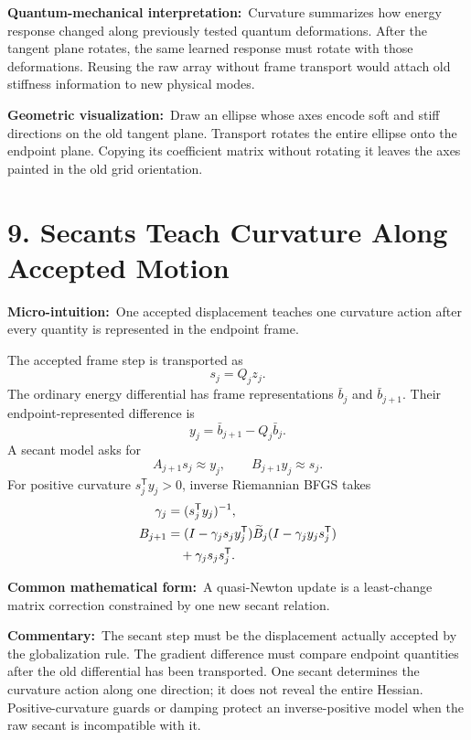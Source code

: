 \documentclass[10pt,twocolumn]{article}
\newcommand{\micro}[1]{\par\noindent\textbf{Micro-intuition:}\ #1\par}
\newcommand{\form}[1]{\par\noindent\textbf{Common mathematical form:}\ #1\par}
\newcommand{\commentary}[1]{\par\noindent\textbf{Commentary:}\ #1\par}
\newcommand{\phys}[1]{\par\noindent\textbf{Quantum-mechanical interpretation:}\ #1\par}
\newcommand{\geom}[1]{\par\noindent\textbf{Geometric visualization:}\ \textcolor{teal!70!black}{#1}\par}
\newcommand{\conceptbreak}{\par\medskip\noindent{\color{black!30}\rule{\columnwidth}{0.35pt}}\par\medskip}
\begin{document}
\phys{Curvature summarizes how energy response changed along previously tested
quantum deformations. After the tangent plane rotates, the same learned response
must rotate with those deformations. Reusing the raw array without frame
transport would attach old stiffness information to new physical modes.}

\geom{Draw an ellipse whose axes encode soft and stiff directions on the old
tangent plane. Transport rotates the entire ellipse onto the endpoint plane.
Copying its coefficient matrix without rotating it leaves the axes painted in
the old grid orientation.}

\conceptbreak

\section*{9. Secants Teach Curvature Along Accepted Motion}

\micro{One accepted displacement teaches one curvature action after every
quantity is represented in the endpoint frame.}

The accepted frame step is transported as
\begin{equation}
s_j=Q_jz_j.
\label{eq:transported-secant-step}
\end{equation}
The ordinary energy differential has frame representations
\(\bar b_j\) and \(\bar b_{j+1}\). Their endpoint-represented difference is
\begin{equation}
y_j=\bar b_{j+1}-Q_j\bar b_j.
\label{eq:transported-gradient-difference}
\end{equation}
A secant model asks for
\begin{equation}
A_{j+1}s_j\approx y_j,
\qquad
B_{j+1}y_j\approx s_j.
\label{eq:secant-relations}
\end{equation}
For positive curvature \(s_j^{\mathsf T}y_j>0\), inverse Riemannian BFGS takes
\begin{align}
\gamma_j&=(s_j^{\mathsf T}y_j)^{-1},
\label{eq:bfgs-scale}\\
B_{j+1}
&=(I-\gamma_js_jy_j^{\mathsf T})\widetilde B_j
(I-\gamma_jy_js_j^{\mathsf T})\notag\\
&\quad+\gamma_js_js_j^{\mathsf T}.
\label{eq:bfgs-update}
\end{align}

\form{A quasi-Newton update is a least-change matrix correction constrained by
one new secant relation.}

\commentary{The secant step must be the displacement actually accepted by the
globalization rule. The gradient difference must compare endpoint quantities
after the old differential has been transported. One secant determines the
curvature action along one direction; it does not reveal the entire Hessian.
Positive-curvature guards or damping protect an inverse-positive model when the
raw secant is incompatible with it.}
\end{document}
